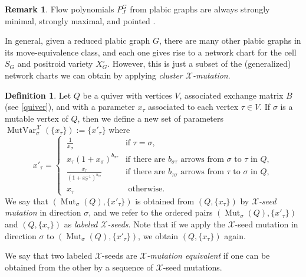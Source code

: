 \documentclass{amsart}
\theoremstyle{definition}
\newtheorem{definition}[thm]{Definition}
\newtheorem{remark}[thm]{Remark}
\numberwithin{equation}{section}
\newcommand{\Mut}{\operatorname{Mut}}
\newcommand{\MutVar}{\operatorname{MutVar}}
\begin{document}
\begin{remark}
Flow polynomials $P_J^G$ from plabic graphs 
are always strongly minimal, strongly maximal, and pointed
	\cite[Corollary 12.4]{RW}.
\end{remark}

In general, given a reduced plabic graph $G$, there are many other
plabic graphs in its move-equivalence class, and each one gives rise
to a network chart for the cell $S_G$ and positroid variety $X_G^{\circ}$.
However, this is just a subset of the (generalized) 
network charts we can obtain
by applying \emph{cluster $\mathcal{X}$-mutation}.

\begin{definition} \label{Xseed}
Let $Q$ be a quiver with vertices $V$,  associated exchange matrix $B$
(see \cref{quiver}), and with a 
parameter $x_{\tau}$ associated to each vertex $\tau \in V$.
If $\sigma$ is a mutable vertex of $Q$,
then we define a new set of 
parameters  $\MutVar_{\sigma}^{\mathcal{X}}(\{x_{\tau}\}) := \{x'_{\tau}\}$  where
\begin{equation}\label{e:XclusterMut2}
x'_{\tau} = \begin{cases}
       \ \frac{1}{x_{\sigma}} & %
      \text{if }\tau = \sigma, \\
   \ x_{\tau}(1+x_{\sigma})^{b_{\sigma \tau}}  
  &\text{if there are }b_{\sigma \tau}
\text{ arrows from }\sigma \text{ to } \tau \text{ in }Q, \\
  \ \frac{x_{\tau}}{(1+x_{\sigma}^{-1})^{b_{\tau \sigma}}} &%
 \text{if there are }b_{\tau \sigma}
\text{ arrows from } \tau \text{ to } \sigma \text{ in }Q,\\
  \ x_{\tau} & %
 \text{ otherwise.}
\end{cases}
\end{equation}
We say that 
$(\Mut_{\sigma}(Q), \{x'_{\tau}\})$ is obtained from 
 $(Q, \{x_{\tau}\})$ by \emph{$\mathcal{X}$-seed mutation}
 in direction $\sigma$, and we refer to the ordered pairs 
$(\Mut_{\sigma}(Q), \{x'_{\tau}\})$  and
 $(Q, \{x_{\tau}\})$ as \emph{labeled $\mathcal{X}$-seeds}.
	Note that if we apply the $\mathcal{X}$-seed mutation in direction $\sigma$ to 
$(\Mut_{\sigma}(Q), \{x'_{\tau}\})$, we obtain  
 $(Q, \{x_{\tau}\})$ again.
	
	We say that two labeled $\mathcal{X}$-seeds are 
	\emph{$\mathcal{X}$-mutation equivalent} if one can be obtained
	from the other by a sequence of $\mathcal{X}$-seed mutations.
\end{definition}
\end{document}
